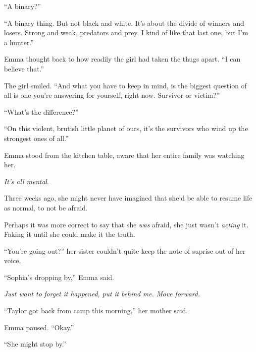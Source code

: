 ``A binary?''



``A binary thing.  But not black and white.  It's about the divide of winners and losers.  Strong and weak, predators and prey.  I kind of like that last one, but I'm a hunter.''



Emma thought back to how readily the girl had taken the thugs apart.  ``I can believe that.''



The girl smiled.  ``And what you have to keep in mind, is the biggest question of all is one you're answering for yourself, right now.  Survivor or victim?''



``What's the difference?''



``On this violent, brutish little planet of ours, it's the survivors who wind up the strongest ones of all.''



\blacksquare



Emma stood from the kitchen table, aware that her entire family was watching her.



\emph{It's all mental}.



Three weeks ago, she might never have imagined that she'd be able to resume life as normal, to not be afraid.



Perhaps it was more correct to say that she \emph{was }afraid, she just wasn't \emph{acting} it.  Faking it until she could make it the truth.



``You're going out?'' her sister couldn't quite keep the note of suprise out of her voice.



``Sophia's dropping by,'' Emma said.



\emph{Just want to forget it happened, put it behind me.  Move forward.}



``Taylor got back from camp this morning,'' her mother said.



Emma paused.  ``Okay.''



``She might stop by.''



